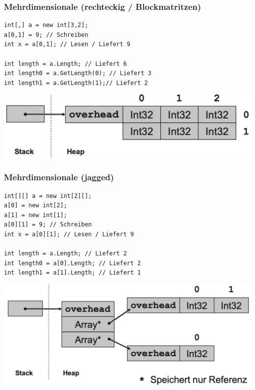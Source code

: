 \subsubsection{Mehrdimensionale (rechteckig / Blockmatritzen)}
\begin{lstlisting}
int[,] a = new int[3,2];
a[0,1] = 9; // Schreiben
int x = a[0,1]; // Lesen / Liefert 9

int length = a.Length; // Liefert 6
int length0 = a.GetLength(0); // Liefert 3
int length1 = a.GetLength(1);// Liefert 2
\end{lstlisting}
\begin{center}
    \includegraphics[scale=.23]{graphic/cGrundlagen/CGrundlagen_MArray_Rechteckig.png}
\end{center}
\vspace{-8pt}

\subsubsection{Mehrdimensionale (jagged)}
\begin{lstlisting}
int[][] a = new int[2][];
a[0] = new int[2];
a[1] = new int[1];
a[0][1] = 9; // Schreiben
int x = a[0][1]; // Lesen / Liefert 9

int length = a.Length; // Liefert 2
int length0 = a[0].Length; // Liefert 2
int length1 = a[1].Length; // Liefert 1
\end{lstlisting}
\begin{center}
    \includegraphics[scale=.23]{graphic/cGrundlagen/CGrundlagen_MArray_Jagged.png}
\end{center}
\vspace{-8pt}


